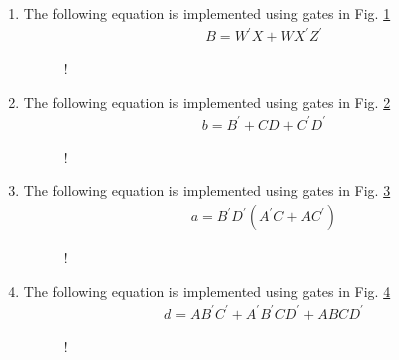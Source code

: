 \renewcommand{\theequation}{\theenumi}
\renewcommand{\thefigure}{\theenumi}
\begin{enumerate}[label=\thesection.\arabic*.,ref=\thesection.\theenumi]

\item The following equation is implemented using gates in Fig. \ref{fig:gates_B}
\begin{align}
B=W^{\prime}X+WX^{\prime}Z^{\prime}
\end{align}
\begin{figure}[!ht]
\begin{center}
\resizebox {\columnwidth} {!} {

}
\end{center}
\caption{}
\label{fig:gates_B}
\end{figure}
\item The following equation is implemented using gates in Fig. \ref{fig:gates_b}
\begin{align}
b=B^{\prime}+CD+C^{\prime}D^{\prime}
\end{align}
\begin{figure}[!ht]
\begin{center}
\resizebox {\columnwidth} {!} {

}
\end{center}
\caption{}
\label{fig:gates_b}
\end{figure}
\item The following equation is implemented using gates in Fig. \ref{fig:gates_a}
\begin{align}
    a=B^{\prime}D^{\prime}(A^{\prime}C+AC^{\prime})
\end{align}
\begin{figure}[!ht]
\begin{center}
\resizebox {\columnwidth} {!} {

}
\end{center}
\caption{}
\label{fig:gates_a}
\end{figure}
%
\item The following equation is implemented using gates in Fig. \ref{fig:gates_d}
\begin{align}
d = AB^{\prime}C^{\prime}+A^{\prime}B^{\prime}CD^{\prime}+ABCD^{\prime}
\end{align}
\begin{figure}[!ht]
\begin{center}
\resizebox {\columnwidth} {!} {

}
\end{center}
\caption{}
\label{fig:gates_d}
\end{figure}
%
%
\end{enumerate}
